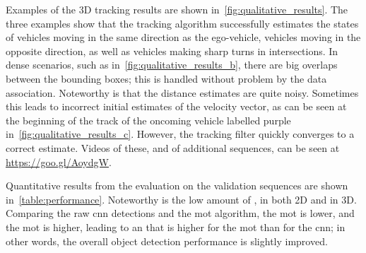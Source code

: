 \documentclass[conference]{IEEEtran}
\newcommand{\glsshort}[1]{\acronymfont{\glsentryshort{#1}}}
\begin{document}
Examples of the 3D tracking results are shown in~\cref{fig:qualitative_results}.
The three examples show that the tracking algorithm successfully estimates the states of vehicles moving in the same direction as the ego-vehicle, vehicles moving in the opposite direction, as well as vehicles making sharp turns in intersections. In dense scenarios, such as in~\cref{fig:qualitative_results_b}, there are big overlaps between the bounding boxes; this is handled without problem by the data association. Noteworthy is that the distance estimates are quite noisy. Sometimes this leads to incorrect initial estimates of the velocity vector, as can be seen at the beginning of the track of the oncoming vehicle labelled purple in~\cref{fig:qualitative_results_c}. However, the tracking filter quickly converges to a correct estimate.
Videos of these, and of additional sequences, can be seen at \mbox{\url{https://goo.gl/AoydgW}}.

\begin{figure*}[!ht]
  \centering
  \caption{Object estimates shown both projected to the image plane (top) and in top-view (bottom). The dotted tracks illustrate the \glsshort{gt} and tracked object estimates at previous time steps. The color of the tracks corresponds to the identity of the tracked object.}
  \label{fig:qualitative_results}
\end{figure*}

Quantitative results from the evaluation on the validation sequences are shown in~\cref{table:performance}. Noteworthy is the low amount of , in both 2D and in 3D. Comparing the raw \gls{cnn} detections and the \gls{mot} algorithm, the \gls{mot}  is lower, and the \gls{mot}  is higher, leading to an  that is higher for the \gls{mot} than for the \gls{cnn}; in other words, the overall object detection performance is slightly improved.
\end{document}
